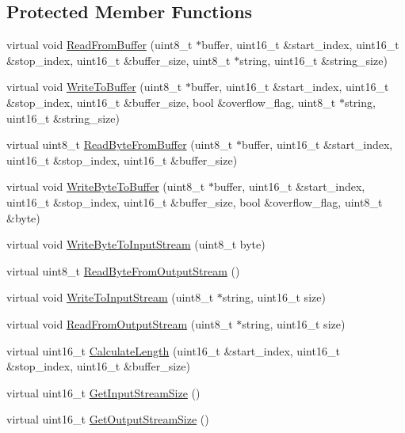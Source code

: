 \subsection*{Protected Member Functions}
\begin{DoxyCompactItemize}
\item 
virtual void \hyperlink{class_stream_add5927208d603b08341f8972652d9c44}{Read\-From\-Buffer} (uint8\-\_\-t $\ast$buffer, uint16\-\_\-t \&start\-\_\-index, uint16\-\_\-t \&stop\-\_\-index, uint16\-\_\-t \&buffer\-\_\-size, uint8\-\_\-t $\ast$string, uint16\-\_\-t \&string\-\_\-size)
\item 
virtual void \hyperlink{class_stream_a456d59b1944143a8e4a977b8861d42ea}{Write\-To\-Buffer} (uint8\-\_\-t $\ast$buffer, uint16\-\_\-t \&start\-\_\-index, uint16\-\_\-t \&stop\-\_\-index, uint16\-\_\-t \&buffer\-\_\-size, bool \&overflow\-\_\-flag, uint8\-\_\-t $\ast$string, uint16\-\_\-t \&string\-\_\-size)
\item 
virtual uint8\-\_\-t \hyperlink{class_stream_a6c49bb8565d238e13c3ca3e9eddcf38e}{Read\-Byte\-From\-Buffer} (uint8\-\_\-t $\ast$buffer, uint16\-\_\-t \&start\-\_\-index, uint16\-\_\-t \&stop\-\_\-index, uint16\-\_\-t \&buffer\-\_\-size)
\item 
virtual void \hyperlink{class_stream_a129f3c3e763ceab692bdde38fdc89402}{Write\-Byte\-To\-Buffer} (uint8\-\_\-t $\ast$buffer, uint16\-\_\-t \&start\-\_\-index, uint16\-\_\-t \&stop\-\_\-index, uint16\-\_\-t \&buffer\-\_\-size, bool \&overflow\-\_\-flag, uint8\-\_\-t \&byte)
\item 
virtual void \hyperlink{class_stream_a70108ab0e811c6cab2636bf7afeb5e14}{Write\-Byte\-To\-Input\-Stream} (uint8\-\_\-t byte)
\item 
virtual uint8\-\_\-t \hyperlink{class_stream_a712a8e0c6659799b1bb2999b53bd983d}{Read\-Byte\-From\-Output\-Stream} ()
\item 
virtual void \hyperlink{class_stream_aa2f020721d273ce821ccf626e5eb773c}{Write\-To\-Input\-Stream} (uint8\-\_\-t $\ast$string, uint16\-\_\-t size)
\item 
virtual void \hyperlink{class_stream_adce437b86a098710237ac7dcccd5508d}{Read\-From\-Output\-Stream} (uint8\-\_\-t $\ast$string, uint16\-\_\-t size)
\item 
virtual uint16\-\_\-t \hyperlink{class_stream_a8abdeaae6339d9873842a951843cb386}{Calculate\-Length} (uint16\-\_\-t \&start\-\_\-index, uint16\-\_\-t \&stop\-\_\-index, uint16\-\_\-t \&buffer\-\_\-size)
\item 
virtual uint16\-\_\-t \hyperlink{class_stream_af502cf8644c8aea119c3f041240161ca}{Get\-Input\-Stream\-Size} ()
\item 
virtual uint16\-\_\-t \hyperlink{class_stream_accb5b713dd8050198fcd8b6b4f7d60ef}{Get\-Output\-Stream\-Size} ()
\end{DoxyCompactItemize}
